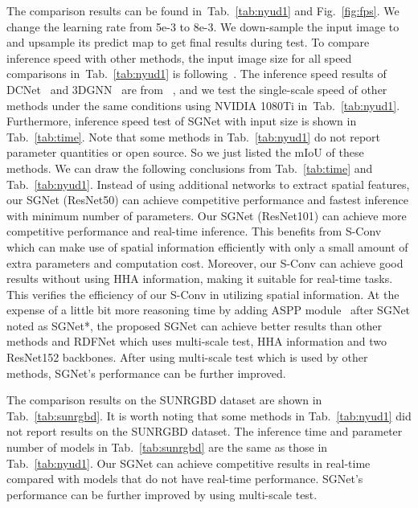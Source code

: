 \documentclass[journal]{IEEEtran}
\newcommand{\figref}[1]{Fig.~\ref{#1}}
\newcommand{\tabref}[1]{Tab.~\ref{#1}}
\newcommand{\mypara}[1]{\noindent {\textbf{#1}}}
\begin{document}
\mypara{NYUDv2 dataset:} The comparison results can be found in~\tabref{tab:nyud1}
and \figref{fig:fps}. We change the learning rate from 5e-3 to
8e-3. We down-sample the input image to  and
upsample its predict map to get final results during test.
To compare inference speed with other methods,
the input image size for all 
speed comparisons in~\tabref{tab:nyud1} 
is  following~\cite{dcnn}. 
The inference speed results of DCNet~\cite{dcnn}
and 3DGNN~\cite{qi20173d} are from ~\cite{dcnn},
and we test the single-scale speed of other methods
under the same conditions using NVIDIA 1080Ti in~\tabref{tab:nyud1}.
Furthermore, 
inference speed test of SGNet with input size  
is shown in 
\tabref{tab:time}.
Note that some methods in \tabref{tab:nyud1} do not
report parameter quantities or open source.
So we just listed the mIoU of these methods.
We can draw the following conclusions from \tabref{tab:time} and
\tabref{tab:nyud1}.
Instead of using additional
networks to extract spatial features, 
our SGNet (ResNet50) can achieve
competitive performance and fastest inference with minimum number of 
parameters.
Our SGNet (ResNet101) can achieve
more competitive performance and real-time inference.
This benefits from S-Conv which can make use of spatial
information efficiently with only a small amount of extra 
parameters and computation cost.
Moreover, our S-Conv can achieve good results without using HHA information,
making it suitable for real-time tasks.
This verifies the efficiency of our S-Conv in
utilizing spatial information.
At the expense of a little bit more reasoning time by
adding ASPP module~\cite{deeplab} after SGNet noted as SGNet*,
the proposed SGNet can achieve better results than
other methods and 
RDFNet which uses multi-scale test, HHA information
and two ResNet152 backbones. After using multi-scale test
which is used by other methods,
SGNet's performance can be further improved.








\mypara{SUNRGBD dataset:}   The comparison results on the
SUNRGBD dataset are shown in \tabref{tab:sunrgbd}.
It is worth noting that some methods in \tabref{tab:nyud1}
did not report results
on the SUNRGBD dataset. The inference time and parameter number of 
models in \tabref{tab:sunrgbd}
are the same as those in \tabref{tab:nyud1}.
Our SGNet can achieve competitive results in real-time compared with 
models that do not have real-time performance.
SGNet's performance can be further improved 
by using multi-scale test.
\end{document}
